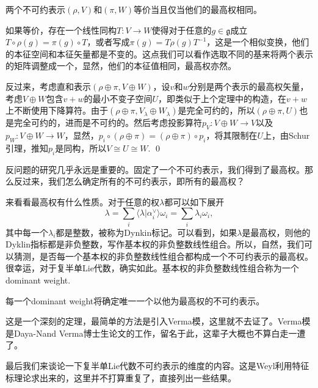 \documentclass[10pt]{article}
\newcommand{\lag}{{\mathfrak{g}}}
\begin{document}
\theo 两个不可约表示$(\rho,V)$和$(\pi,W)$等价当且仅当他们的最高权相同。

\proof 如果等价，存在一个线性同构$T:V\to W$使得对于任意的$g\in\lag$成立$T\circ \rho(g)=\pi(g)\circ T$，或者写成$\pi(g)=T\rho(g)T^{-1}$，这是一个相似变换，他们的本征空间和本征矢量都是不变的。这点我们可以看作选取不同的基来将两个表示的矩阵调整成一个，显然，他们的本征值相同，最高权亦然。

反过来，考虑直和表示$(\rho\oplus\pi,V\oplus W)$，设$v$和$w$分别是两个表示的最高权矢量，考虑$V\oplus W$包含$v+w$的最小不变子空间$U$，即类似于上个定理中的构造，在$v+w$上不断使用下降算符。由于$(\rho\oplus\pi,V_\lambda\oplus W_\lambda)$是完全可约的，所以$(\rho\oplus\pi,U)$也是完全可约的，进而是不可约的。然后考虑投影算符$p_V:V\oplus W\to V$以及$p_W:V\oplus W\to W$，显然，$p_i\circ (\rho\oplus\pi)=(\rho\oplus\pi)\circ p_i$，将其限制在$U$上，由Schur引理，推知$p_i$是同构，所以$V\cong U\cong W$. \qed

\para 反问题的研究几乎永远是重要的。固定了一个不可约表示，我们得到了最高权。那么反过来，我们怎么确定所有的不可约表示，即所有的最高权？

来看看最高权有什么性质。对于任意的权$\lambda$都可以如下展开
\[
	\lambda=\sum_i \langle \lambda|\alpha_i^\vee\rangle \omega_i=\sum_i \lambda_i \omega_i,
\]
其中每一个$\lambda_i$都是整数，被称为Dynkin标记。可以看到，如果$\lambda$是最高权，则他的Dyklin指标都是非负整数，写作基本权的非负整数线性组合。所以，自然，我们可以猜测，是否每一个基本权的非负整数线性组合都构成一个不可约表示的最高权。很幸运，对于复半单Lie代数，确实如此。基本权的非负整数线性组合称为一个dominant weight.



\theo 每一个dominant weight将确定唯一一个以他为最高权的不可约表示。

这是一个深刻的定理，最简单的方法是引入Verma模，这里就不去证了。Verma模是Daya-Nand Verma博士生论文的工作，留名于此，这辈子大概也不算白走一遭了。

\para 最后我们来谈论一下复半单Lie代数不可约表示的维度的内容。这是Weyl利用特征标理论求出来的，这里并不打算重复了，直接列出一些结果。
\end{document}
